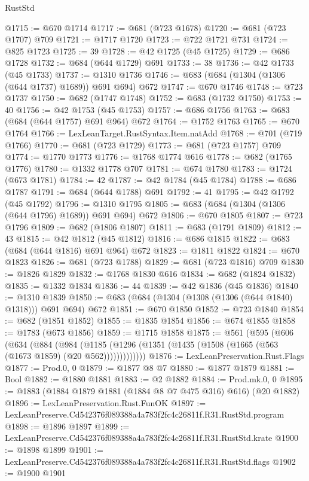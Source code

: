 \begin{lexlean}{RustStd}
\begin{coremodule}
@1715 := @670 @1714
@1717 := @681 (@723 @1678)
@1720 := @681 (@723 @1707) @709
@1721 := @1717 @1720
@1723 := @722 @1721 @731
@1724 := @825 @1723
@1725 := 39
@1728 := @42 @1725 (@45 @1725)
@1729 := @686 @1728
@1732 := @684 (@644 @1729) @691
@1733 := 38
@1736 := @42 @1733 (@45 @1733)
@1737 := @1310 @1736
@1746 := @683 (@684 (@1304 (@1306 (@644 @1737) @1689)) @691 @694) @672
@1747 := @670 @1746
@1748 := @723 @1737
@1750 := @682 (@1747 @1748)
@1752 := @683 (@1732 @1750)
@1753 := 40
@1756 := @42 @1753 (@45 @1753)
@1757 := @686 @1756
@1763 := @683 (@684 (@644 @1757) @691 @964) @672
@1764 := @1752 @1763
@1765 := @670 @1764
@1766 := LexLeanTarget.RustSyntax.Item.natAdd
@1768 := @701 (@719 @1766)
@1770 := @681 (@723 @1729)
@1773 := @681 (@723 @1757) @709
@1774 := @1770 @1773
@1776 := @1768 @1774 @616
@1778 := @682 (@1765 @1776)
@1780 := @1332 @1778 @707
@1781 := @674 @1780
@1783 := @1724 (@673 @1781)
@1784 := 42
@1787 := @42 @1784 (@45 @1784)
@1788 := @686 @1787
@1791 := @684 (@644 @1788) @691
@1792 := 41
@1795 := @42 @1792 (@45 @1792)
@1796 := @1310 @1795
@1805 := @683 (@684 (@1304 (@1306 (@644 @1796) @1689)) @691 @694) @672
@1806 := @670 @1805
@1807 := @723 @1796
@1809 := @682 (@1806 @1807)
@1811 := @683 (@1791 @1809)
@1812 := 43
@1815 := @42 @1812 (@45 @1812)
@1816 := @686 @1815
@1822 := @683 (@684 (@644 @1816) @691 @964) @672
@1823 := @1811 @1822
@1824 := @670 @1823
@1826 := @681 (@723 @1788)
@1829 := @681 (@723 @1816) @709
@1830 := @1826 @1829
@1832 := @1768 @1830 @616
@1834 := @682 (@1824 @1832)
@1835 := @1332 @1834
@1836 := 44
@1839 := @42 @1836 (@45 @1836)
@1840 := @1310 @1839
@1850 := @683 (@684 (@1304 (@1308 (@1306 (@644 @1840) @1318))) @691 @694) @672
@1851 := @670 @1850
@1852 := @723 @1840
@1854 := @682 (@1851 @1852)
@1855 := @1835 @1854
@1856 := @674 @1855
@1858 := @1783 (@673 @1856)
@1859 := @1715 @1858
@1875 := @561
    (@595
      (@606
        (@634
          (@884
            (@984
              (@1185 (@1296 (@1351 (@1435 (@1508 (@1665 (@563 (@1673 @1859) (@20 @562)))))))))))))
@1876 := LexLeanPreservation.Rust.Flags
@1877 := Prod.{0, 0}
@1879 := @1877 @8 @7
@1880 := @1877 @1879
@1881 := Bool
@1882 := @1880 @1881
@1883 := @2 @1882
@1884 := Prod.mk.{0, 0}
@1895 := @1883 (@1884 @1879 @1881 (@1884 @8 @7 @475 @316) @616) (@20 @1882)
@1896 := LexLeanPreservation.Rust.FunOK
@1897 := LexLeanPreserve.Cd542376f089388a4a783f2fc4c26811f.R31.RustStd.program
@1898 := @1896 @1897
@1899 := LexLeanPreserve.Cd542376f089388a4a783f2fc4c26811f.R31.RustStd.krate
@1900 := @1898 @1899
@1901 := LexLeanPreserve.Cd542376f089388a4a783f2fc4c26811f.R31.RustStd.flags
@1902 := @1900 @1901

\end{coremodule}
\end{lexlean}
